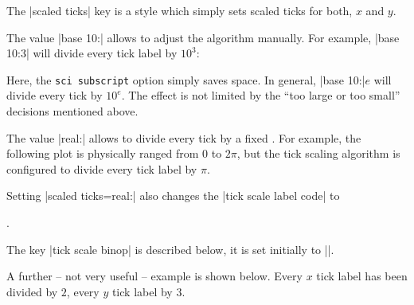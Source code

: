 \begin{pgfplotsxykeylist}
	The |scaled ticks| key is a style which simply sets scaled ticks for both, $x$ and $y$.

	The value |base 10:| allows to adjust the algorithm manually. For example, |base 10:3| will divide every tick label by $10^3$:
\begin{codeexample}[]
\end{codeexample}
\noindent Here, the \texttt{sci subscript} option simply saves space.
In general, |base 10:|$e$ will divide every tick by $10^e$. The effect
is not limited by the ``too large or too small'' decisions mentioned
above.

	The value |real:| allows to divide every tick by a fixed .
	For example, the following plot is physically ranged from $0$ to $2\pi$, but the tick scaling algorithm is configured to divide every tick label by $\pi$.
\begin{codeexample}[]
\end{codeexample}
	\noindent Setting |scaled ticks=real:| also changes the |tick scale label code| to
\begin{codeexample}
.
\end{codeexample}
\noindent The key |tick scale binop| is described below, it is set initially to |\cdot|.

A further -- not very useful -- example is shown below. Every $x$ tick label has been divided by $2$, every $y$ tick label by $3$.
\nobreak
\begin{codeexample}[]
\end{codeexample}


\end{pgfplotsxykeylist}

